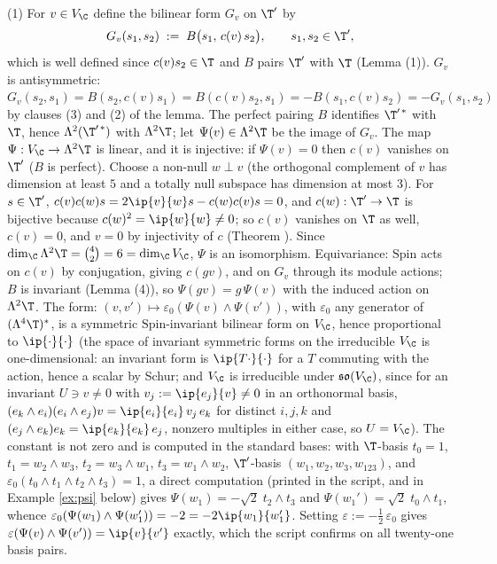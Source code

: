 (1) For $v \in V_\C$ define the bilinear form $G_v$ on $\T'$ by
\[
G_v(s_1, s_2) \;:=\; B\bigl(s_1,\, c(v)\,s_2\bigr), \qquad s_1, s_2 \in \T',
\]
which is well defined since $c(v)s_2 \in \T$ and $B$ pairs $\T'$ with $\T$ (Lemma (1)). $G_v$ is antisymmetric: $G_v(s_2, s_1) = B(s_2, c(v)s_1) = B(c(v)s_2, s_1) = -B(s_1, c(v)s_2) = -G_v(s_1,s_2)$ by clauses (3) and (2) of the lemma. The perfect pairing $B$ identifies $\T'^{\,*}$ with $\T$, hence $\Lambda^2(\T'^{\,*})$ with $\Lambda^2\T$; let $\Psi(v) \in \Lambda^2\T$ be the image of $G_v$. The map $\Psi: V_\C \to \Lambda^2\T$ is linear, and it is injective: if $\Psi(v) = 0$ then $c(v)$ vanishes on $\T'$ ($B$ is perfect). Choose a non-null $w \perp v$ (the orthogonal complement of $v$ has dimension at least $5$ and a totally null subspace has dimension at most $3$). For $s \in \T'$, $c(v)c(w)s = 2\ip{v}{w}s - c(w)c(v)s = 0$, and $c(w): \T' \to \T$ is bijective because $c(w)^2 = \ip{w}{w} \neq 0$; so $c(v)$ vanishes on $\T$ as well, $c(v) = 0$, and $v = 0$ by injectivity of $c$ (Theorem ). Since $\dim_\C \Lambda^2\T = \binom42 = 6 = \dim_\C V_\C$, $\Psi$ is an isomorphism. Equivariance: $\mathrm{Spin}$ acts on $c(v)$ by conjugation, giving $c(gv)$, and on $G_v$ through its module actions; $B$ is invariant (Lemma (4)), so $\Psi(gv) = g\,\Psi(v)$ with the induced action on $\Lambda^2\T$. The form: $(v, v') \mapsto \varepsilon_0(\Psi(v)\wedge\Psi(v'))$, with $\varepsilon_0$ any generator of $(\Lambda^4\T)^*$, is a symmetric $\mathrm{Spin}$-invariant bilinear form on $V_\C$, hence proportional to $\ip{\cdot}{\cdot}$ (the space of invariant symmetric forms on the irreducible $V_\C$ is one-dimensional: an invariant form is $\ip{T\cdot}{\cdot}$ for a $T$ commuting with the action, hence a scalar by Schur; and $V_\C$ is irreducible under $\mathfrak{so}(V_\C)$, since for an invariant $U \ni v \neq 0$ with $v_j := \ip{e_j}{v} \neq 0$ in an orthonormal basis, $(e_k\wedge e_i)(e_i\wedge e_j)v = \ip{e_i}{e_i}\,v_j\,e_k$ for distinct $i, j, k$ and $(e_j\wedge e_k)e_k = \ip{e_k}{e_k}\,e_j$, nonzero multiples in either case, so $U = V_\C$). The constant is not zero and is computed in the standard bases: with $\T$-basis $t_0 = 1$, $t_1 = w_2\wedge w_3$, $t_2 = w_3 \wedge w_1$, $t_3 = w_1\wedge w_2$, $\T'$-basis $(w_1, w_2, w_3, w_{123})$, and $\varepsilon_0(t_0\wedge t_1\wedge t_2\wedge t_3) = 1$, a direct computation (printed in the script, and in Example \ref{ex:psi} below) gives $\Psi(w_1) = -\sqrt2\; t_2\wedge t_3$ and $\Psi(w_1') = \sqrt2\; t_0 \wedge t_1$, whence $\varepsilon_0(\Psi(w_1)\wedge\Psi(w_1')) = -2 = -2\ip{w_1}{w_1'}$. Setting $\varepsilon := -\tfrac12\,\varepsilon_0$ gives $\varepsilon(\Psi(v)\wedge\Psi(v')) = \ip{v}{v'}$ exactly, which the script confirms on all twenty-one basis pairs.
